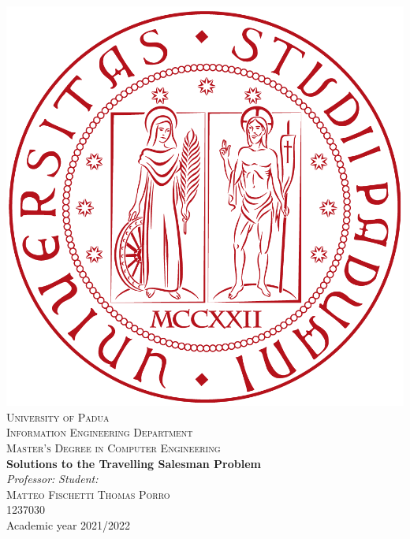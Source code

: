 



\begin{titlepage}
\begin{center}
\includegraphics[scale=0.1]{images/logo.png}\\

\vspace{0.8cm}
\textsc{\LARGE University of Padua}\\
\vspace{0.45cm}
\textsc{\large Information Engineering Department}\\
\vspace{0.4cm}
\textsc{\large Master’s Degree in Computer Engineering}\\
\vfill
{ \LARGE \bfseries Solutions to the Travelling Salesman Problem
}\\
\vfill
\textit{\large Professor:} \hfill \textit{\large Student:}\\
\textsc{\large Matteo Fischetti} \hfill \textsc{Thomas Porro}\\
\hfill \textsc{1237030}\\

\vfill
{\large Academic year 2021/2022}
\end{center}
\end{titlepage}

